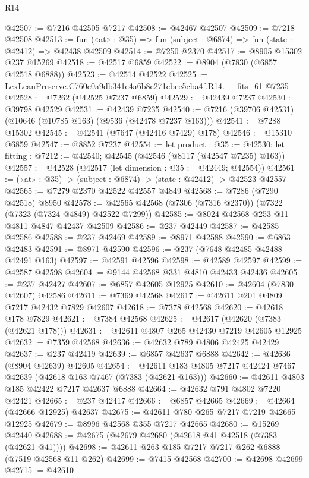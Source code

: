 \begin{lexlean}{R14}
\begin{coremodule}
@42507 := @7216 @42505 @7217
@42508 := @42467 @42507
@42509 := @7218 @42508
@42513 := fun («at» : @35) => fun (subject : @6874) => fun (state : @42412) => @42438 @42509
@42514 := @7250 @2370
@42517 := @8905 @15302 @237 @15269
@42518 := @42517 @6859
@42522 := @8904 (@7830 (@6857 @42518 @6888))
@42523 := @42514 @42522
@42525 := LexLeanPreserve.C760c0a9db341e4a6b8c271cbee5cba4f.R14.__fits_61 @7235
@42528 := @7262 (@42525 @7237 @6859)
@42529 := @42439 @7237
@42530 := @39798 @42529
@42531 := @42439 @7235
@42540 := @7216 (@39706 @42531) (@10646 (@10785 @163) (@9536 (@42478 @7237 @163)))
@42541 := @7288 @15302
@42545 := @42541 (@7647 (@42416 @7429) @178)
@42546 := @15310 @6859
@42547 := @8852 @7237
@42554 := let product : @35 := @42530;
  let fitting : @7212 := @42540; @42545 (@42546 (@8117 (@42547 @7235) @163))
@42557 := @42528 (@42517 (let dimension : @35 := @42449; @42554))
@42561 := («at» : @35) -> (subject : @6874) -> (state : @42412) -> @42523 @42557
@42565 := @7279 @2370 @42522 @42557 @4849
@42568 := @7286 (@7290 @42518) @8950
@42578 := @42565 @42568 (@7306 (@7316 @2370)) (@7322 (@7323 (@7324 @4849) @42522 @7299))
@42585 := @8024 @42568 @253 @11 @4811 @4847 @42437 @42509
@42586 := @237 @42449
@42587 := @42585 @42586
@42588 := @237 @42469
@42589 := @8971 @42588
@42590 := @6863 @42483
@42591 := @8971 @42590
@42596 := @237 (@7648 @42485 @42488 @42491 @163)
@42597 := @42591 @42596
@42598 := @42589 @42597
@42599 := @42587 @42598
@42604 := @9144 @42568 @331 @4810 @42433 @42436
@42605 := @237 @42427
@42607 := @6857 @42605 @12925
@42610 := @42604 (@7830 @42607) @42586
@42611 := @7369 @42568
@42617 := @42611 @201 @4809 @7217 @42432 @7829 @42607
@42618 := @7378 @42568
@42620 := @42618 @178 @7829
@42621 := @7384 @42568
@42625 := @42617 (@42620 (@7383 (@42621 @178)))
@42631 := @42611 @4807 @265 @42430 @7219 @42605 @12925
@42632 := @7359 @42568
@42636 := @42632 @789 @4806 @42425 @42429
@42637 := @237 @42419
@42639 := @6857 @42637 @6888
@42642 := @42636 (@8904 @42639) @42605
@42654 := @42611 @183 @4805 @7217 @42424 @7467 @42639 (@42618 @163 @7467 (@7383 (@42621 @163)))
@42660 := @42611 @4803 @185 @42422 @7217 @42637 @6888
@42664 := @42632 @791 @4802 @7220 @42421
@42665 := @237 @42417
@42666 := @6857 @42665
@42669 := @42664 (@42666 @12925) @42637
@42675 := @42611 @780 @265 @7217 @7219 @42665 @12925
@42679 := @8996 @42568 @355 @7217 @42665
@42680 := @15269 @42440
@42688 := @42675 (@42679 @42680 (@42618 @41 @42518 (@7383 (@42621 @41))))
@42698 := @42611 @263 @185 @7217 @7217 @262 @6888 (@7519 @42568 @11 @262)
@42699 := @7415 @42568
@42700 := @42698 @42699
@42715 := @42610

\end{coremodule}
\end{lexlean}
